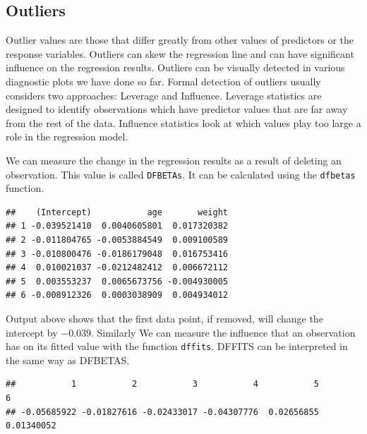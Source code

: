 \documentclass[10pt, letterpaper, twoside]{memoir}\usepackage{knitr}
\begin{document}
\subsection{Outliers}

Outlier values are those that differ greatly from other values of predictors or the response variables. Outliers can skew the regression line and can have significant influence on the regression results. Outliers can be visually detected in various diagnostic plots we have done so far. Formal detection of outliers usually considers two approaches: Leverage and Influence. Leverage statistics are designed to identify observations which have predictor values that are far away from the rest of the data. Influence statistics look at which values play too large a role in the regression model.

We can measure the change in the regression results as a result of deleting an observation. This value is called \texttt{DFBETAs}. It can be calculated using the \texttt{dfbetas}  function.

\begin{knitrout}
\color{fgcolor}\begin{kframe}
\begin{alltt}
 \hlkwb{<-} 
\end{alltt}
\begin{verbatim}
##    (Intercept)           age       weight
## 1 -0.039521410  0.0040605801  0.017320382
## 2 -0.011804765 -0.0053884549  0.009100589
## 3 -0.010800476 -0.0186179048  0.016753416
## 4  0.010021037 -0.0212482412  0.006672112
## 5  0.003553237  0.0065673756 -0.004930005
## 6 -0.008912326  0.0003038909  0.004934012
\end{verbatim}
\end{kframe}
\end{knitrout}

Output above shows that the first data point, if removed, will change the intercept by $-0.039$. Similarly We can measure the influence that an observation has on its fitted value with the function \texttt{dffits}.  DFFITS can be interpreted in the same way as DFBETAS.

\begin{knitrout}
\color{fgcolor}\begin{kframe}
\begin{alltt}
 \hlkwb{<-} 
\end{alltt}
\begin{verbatim}
##           1           2           3           4           5           6 
## -0.05685922 -0.01827616 -0.02433017 -0.04307776  0.02656855  0.01340052
\end{verbatim}
\end{kframe}
\end{knitrout}
\end{document}
